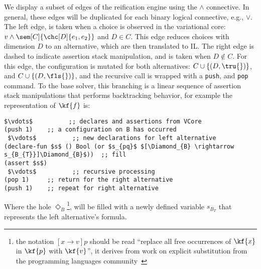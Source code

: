 We display a subset of edges of the reification engine using the $\wedge$
connective. In general, these edges will be duplicated for each binary logical
connective, e.g., $\vee$. The left edge, is taken when a choice is observed in
the variational core: $v \wedge \sem[C]{\chc[D]{e_{1}, e_{2}}}$ and $D \in C$.
This edge reduces choices with dimension $D$ to an alternative, which are then
translated to IL\@. The right edge is dashed to indicate assertion stack
manipulation, and is taken when $D \notin C$. For this edge, the configuration
is mutated for both alternatives: $C \cup \{(D, \tru{})\}$, and $C \cup \{(D,
\fls{})\}$, and the recursive call is wrapped with a \texttt{push}, and
\texttt{pop} command. To the base solver, this branching is a linear sequence of
assertion stack manipulations that performs backtracking behavior, for example
the representation of $\kf{f}$ is:
%
\begin{lstlisting}[columns=flexible,keepspaces=true]
 $\vdots$          ;; declares and assertions from VCore
(push 1)    ;; a configuration on B has occurred
 $\vdots$          ;; new declarations for left alternative
(declare-fun $s$ () Bool (or $s_{pq}$ $[\Diamond_{B} \rightarrow s_{B_{T}}]\Diamond_{B}$))  ;; fill
(assert $s$)
 $\vdots$          ;; recursive processing
(pop 1)     ;; return for the right alternative
(push 1)    ;; repeat for right alternative
\end{lstlisting}
%
Where the hole $\Diamond_{B}$\footnote{the notation $[x \rightarrow v]p$ should
  be read ``replace all free occurrences of $\kf{x}$ in $\kf{p}$ with
  $\kf{v}$'', it derives from work on explicit substitution from the programming
  languages community~\cite{10.5555/509043}}, will be filled with a newly
defined variable $s_{B_{T}}$ that represents the left alternative's formula.

